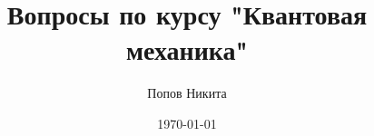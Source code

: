 \documentclass{article}
\begin{document}
\title{Вопросы по курсу "Квантовая механика"}
\author{Попов Никита}
\date{\today}
\maketitle
\end{document}

